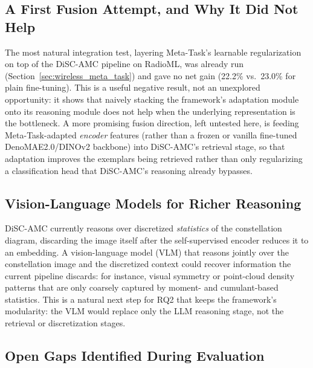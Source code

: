 \subsection{A First Fusion Attempt, and Why It Did Not Help}

The most natural integration test, layering Meta-Task's learnable regularization on top of the DiSC-AMC pipeline on RadioML, was already run (Section~\ref{sec:wireless_meta_task}) and gave no net gain (22.2\% vs.\ 23.0\% for plain fine-tuning). This is a useful negative result, not an unexplored opportunity: it shows that naively stacking the framework's adaptation module onto its reasoning module does not help when the underlying representation is the bottleneck. A more promising fusion direction, left untested here, is feeding Meta-Task-adapted \emph{encoder} features (rather than a frozen or vanilla fine-tuned DenoMAE2.0/DINOv2 backbone) into DiSC-AMC's retrieval stage, so that adaptation improves the exemplars being retrieved rather than only regularizing a classification head that DiSC-AMC's reasoning already bypasses.

\subsection{Vision-Language Models for Richer Reasoning}

DiSC-AMC currently reasons over discretized \emph{statistics} of the constellation diagram, discarding the image itself after the self-supervised encoder reduces it to an embedding. A vision-language model (VLM) that reasons jointly over the constellation image and the discretized context could recover information the current pipeline discards: for instance, visual symmetry or point-cloud density patterns that are only coarsely captured by moment- and cumulant-based statistics. This is a natural next step for RQ2 that keeps the framework's modularity: the VLM would replace only the LLM reasoning stage, not the retrieval or discretization stages.

\subsection{Open Gaps Identified During Evaluation}

